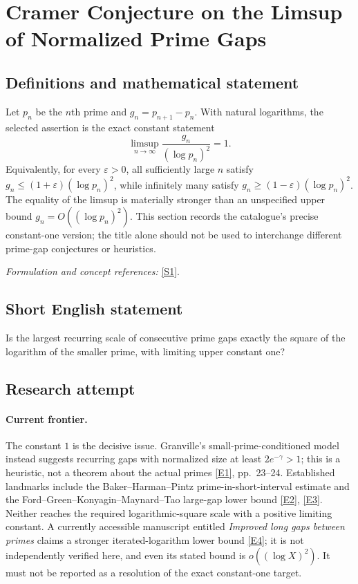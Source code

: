 \documentclass[11pt,a4paper]{article}
\newcommand{\eps}{\varepsilon}
\newcommand{\sref}[2]{\hyperlink{source:#1:#2}{[S#2]}}
\newcommand{\eref}[2]{\hyperlink{extra:#1:#2}{[E#2]}}
\newif\ifshowcatalogue
\newcommand{\cataloguescope}[1]{\ifshowcatalogue
 \paragraph{Exact scope in the supplied catalogue.}
 \begin{quote}\small #1\end{quote}\fi}
\numberwithin{equation}{section}
\begin{document}
\setcounter{section}{0}
\clearpage
\section*{\texorpdfstring{Cramer Conjecture on the Limsup of Normalized Prime Gaps}{Cramer Conjecture on the Limsup of Normalized Prime Gaps}}\label{statement}
\subsection{Definitions and mathematical statement}
Let $p_n$ be the $n$th prime and $g_n=p_{n+1}-p_n$. With natural logarithms, the selected assertion is the exact constant statement
\[
 \limsup_{n\to\infty}\frac{g_n}{(\log p_n)^2}=1.
\]
Equivalently, for every $\eps>0$, all sufficiently large $n$ satisfy
$g_n\le(1+\eps)(\log p_n)^2$, while infinitely many satisfy
$g_n\ge(1-\eps)(\log p_n)^2$. The equality of the limsup is materially stronger than an unspecified upper bound $g_n=O((\log p_n)^2)$. This section records the catalogue's precise constant-one version; the title alone should not be used to interchange different prime-gap conjectures or heuristics.
\par\smallskip\textit{Formulation and concept references:} \sref{statement}{1}.
\cataloguescope{Prove that lim sup\_\{n -> infinity\} (p\_\{n+1\} - p\_n) / (log p\_n)\textasciicircum{}2 = 1, where p\_n is the n-th prime.}
\subsection{Short English statement}
Is the largest recurring scale of consecutive prime gaps exactly the square of the logarithm of the smaller prime, with limiting upper constant one?
\subsection{Research attempt}

\paragraph{Current frontier.}
The constant $1$ is the decisive issue. Granville's small-prime-conditioned
model instead suggests recurring gaps with normalized size at least
$2e^{-\gamma}>1$; this is a heuristic, not a theorem about the actual
primes \eref{statement}{1}, pp.~23--24. Established landmarks include the
Baker--Harman--Pintz prime-in-short-interval estimate and the
Ford--Green--Konyagin--Maynard--Tao large-gap lower bound
\eref{statement}{2}, \eref{statement}{3}. Neither reaches the required logarithmic-square
scale with a positive limiting constant. A currently accessible manuscript
entitled \emph{Improved long gaps between primes} claims a stronger
iterated-logarithm lower bound \eref{statement}{4}; it is not independently
verified here, and even its stated bound is $o((\log X)^2)$. It must not be
reported as a resolution of the exact constant-one target.
\end{document}

